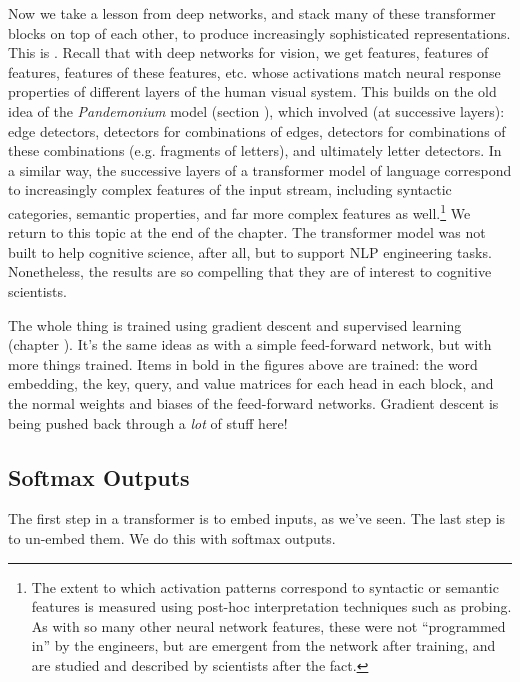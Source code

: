 Now we take a lesson from deep networks, and stack many of these transformer blocks on top of each other, to produce increasingly sophisticated representations.  This is . Recall that with deep networks for vision, we get features, features of features, features of these features, etc. whose activations match neural response properties of different layers of the human visual system. This builds on the old idea of the \emph{Pandemonium} model (section ), which involved (at successive layers): edge detectors, detectors for combinations of edges, detectors for combinations of these combinations (e.g. fragments of letters), and ultimately letter detectors. In a similar way, the successive layers of a transformer model of language correspond to increasingly complex features of the input stream, including syntactic categories, semantic properties, and far more complex features as well.\footnote{The extent to which activation patterns correspond to syntactic or semantic features is measured using post-hoc interpretation techniques such as probing. As with so many other neural network features, these were not ``programmed in'' by the engineers, but are emergent from the network after training, and are studied and described by scientists after the fact.}  We return to this topic at the end of the chapter. The transformer model was not built to help cognitive science, after all, but to support NLP engineering tasks. Nonetheless, the results are so compelling that they are of interest to cognitive scientists.

The whole thing is trained using gradient descent and supervised learning (chapter ). It's the same ideas as with a simple feed-forward network, but with more things trained. Items in bold in the figures above are trained: the word embedding, the key, query, and value matrices for each head  in each block, and the normal weights and biases of the feed-forward networks.  Gradient descent is being pushed back through a \emph{lot} of stuff here!

\subsection{Softmax Outputs}

The first step in a transformer is to embed inputs, as we've seen. The last step is to un-embed them. We do this with softmax outputs.

